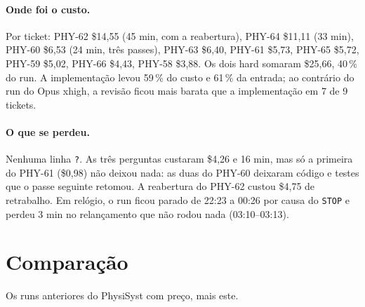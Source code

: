 \documentclass[11pt,a4paper]{article}
\begin{document}
\paragraph{Onde foi o custo.} Por ticket: PHY-62 \$14,55 (45 min, com a
reabertura), PHY-64 \$11,11 (33 min), PHY-60 \$6,53 (24 min, três passes),
PHY-63 \$6,40, PHY-61 \$5,73, PHY-65 \$5,72, PHY-59 \$5,02, PHY-66 \$4,43,
PHY-58 \$3,88. Os dois hard somaram \$25,66, 40\,\% do run. A implementação
levou 59\,\% do custo e 61\,\% da entrada; ao contrário do run do Opus
xhigh, a revisão ficou mais barata que a implementação em 7 de 9 tickets.

\paragraph{O que se perdeu.} Nenhuma linha \texttt{?}. As três perguntas
custaram \$4,26 e 16 min, mas só a primeira do PHY-61 (\$0,98) não deixou nada:
as duas do PHY-60 deixaram código e testes que o passe seguinte retomou. A
reabertura do PHY-62 custou \$4,75 de retrabalho. Em relógio, o run ficou parado
de 22:23 a 00:26 por causa do \texttt{STOP} e perdeu 3 min no relançamento que
não rodou nada (03:10--03:13).

\section{Comparação}

Os runs anteriores do PhysiSyst com preço, mais este.

\medskip
{}
\end{document}
